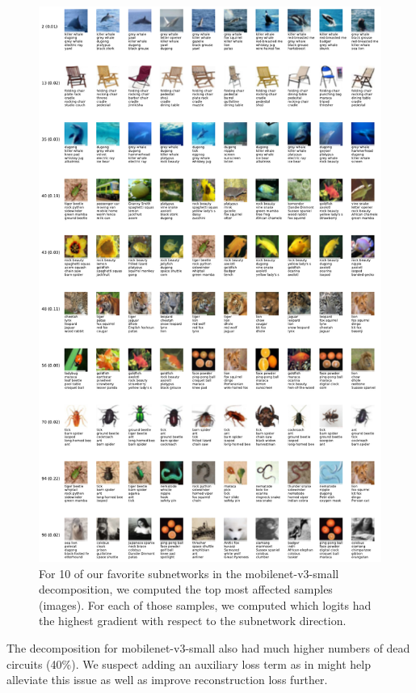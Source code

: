 \documentclass{article}
\theoremstyle{plain}
\theoremstyle{definition}
\theoremstyle{remark}
\begin{document}
\begin{figure}[ht]
    \centerline{\includegraphics[width=\textwidth]{../figures/favorite_cnn_circuits.pdf}}
    \centering
    \caption{For 10 of our favorite subnetworks in the mobilenet-v3-small decomposition, we computed the top most affected samples (images). For each of those samples, we computed which logits had the highest gradient with respect to the subnetwork direction.}\label{fig:favorite_cnn_circuits}
\end{figure}

The decomposition for mobilenet-v3-small also had much higher numbers of dead circuits (40\%). We suspect adding an auxiliary loss term as in \cite{gao2024scaling} might help alleviate this issue as well as improve reconstruction loss further.
\end{document}

